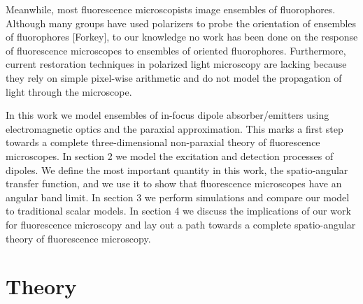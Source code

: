 \documentclass{osa-article}
\begin{document}
Meanwhile, most fluorescence microscopists image ensembles of fluorophores.
Although many groups have used polarizers to probe the orientation of ensembles
of fluorophores \cite{mehta2016} [Forkey], to our knowledge no
work has been done on the response of fluorescence microscopes to ensembles of
oriented fluorophores. Furthermore, current restoration techniques in polarized
light microscopy are lacking because they rely on simple pixel-wise arithmetic
and do not model the propagation of light through the microscope.

In this work we model ensembles of in-focus dipole absorber/emitters using
electromagnetic optics and the paraxial approximation. This marks a first step
towards a complete three-dimensional non-paraxial theory of fluorescence
microscopes. In section 2 we model the excitation and detection processes of
dipoles. We define the most important quantity in this work, the spatio-angular
transfer function, and we use it to show that fluorescence microscopes have an
angular band limit. In section 3 we perform simulations and compare our model to
traditional scalar models. In section 4 we discuss the implications of our work
for fluorescence microscopy and lay out a path towards a complete spatio-angular
theory of fluorescence microscopy.

\section{Theory}
\end{document}
